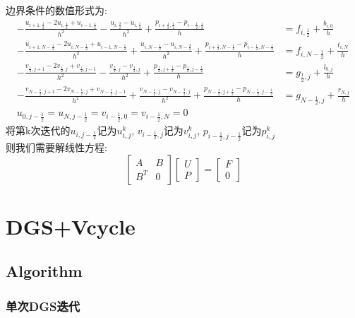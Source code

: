 \documentclass{article}
\begin{document}
边界条件的数值形式为:
\begin{align*}
-\frac{u_{i+1,\frac{1}{2}}-2u_{i,\frac{1}{2}}+u_{i-1,\frac{1}{2}}}{h^2}
-\frac{u_{i,\frac{3}{2}}-u_{i,\frac{1}{2}}}{h^2}
+\frac{p_{i+\frac{1}{2},\frac{1}{2}}-p_{i-\frac{1}{2},\frac{1}{2}}}{h}
&= f_{i,\frac{1}{2}}+\frac{b_{i,0}}{h}\\
-\frac{u_{i+1,N-\frac{1}{2}}-2u_{i,N-\frac{1}{2}}+u_{i-1,N-\frac{1}{2}}}{h^2}
+\frac{u_{i,N-\frac{1}{2}}-u_{i,N-\frac{3}{2}}}{h^2}
+\frac{p_{i+\frac{1}{2},N-\frac{1}{2}}-p_{i-\frac{1}{2},N-\frac{1}{2}}}{h}
&= f_{i,N-\frac{1}{2}}+\frac{t_{i,N}}{h}\\
-\frac{v_{\frac{1}{2},j+1}-2v_{\frac{1}{2},j}+v_{\frac{1}{2},j-1}}{h^2}
-\frac{v_{\frac{3}{2},j}-v_{\frac{1}{2},j}}{h^2}
+\frac{p_{\frac{1}{2},j+\frac{1}{2}}-p_{\frac{1}{2},j-\frac{1}{2}}}{h}
&= g_{\frac{1}{2},j}+\frac{l_{0,j}}{h}\\
-\frac{v_{N-\frac{1}{2},j+1}-2v_{N-\frac{1}{2},j}+v_{N-\frac{1}{2},j-1}}{h^2}
+\frac{v_{N-\frac{1}{2},j}-v_{N-\frac{3}{2},j}}{h^2}
+\frac{p_{N-\frac{1}{2},j+\frac{1}{2}}-p_{N-\frac{1}{2},j-\frac{1}{2}}}{h}
&= g_{N-\frac{1}{2},j}+\frac{r_{N,j}}{h}\\
u_{0,j-\frac{1}{2}}=u_{N,j-\frac{1}{2}}=v_{i-\frac{1}{2},0}=v_{i-\frac{1}{2},N}=0
\end{align*}
将第k次迭代的$u_{i,j-\frac{1}{2}}$记为$u^k_{i,j}$, 
$v_{i-\frac{1}{2},j}$记为$v^k_{i,j}$, 
$p_{i-\frac{1}{2},j-\frac{1}{2}}$记为$p^k_{i,j}$\\
则我们需要解线性方程:
$$
\begin{bmatrix}
	A & B\\
	B^T & 0
\end{bmatrix}
\begin{bmatrix}
	U\\
	P
\end{bmatrix}
=
\begin{bmatrix}
	F\\
	0
\end{bmatrix}
$$
\section{DGS+Vcycle}
\subsection{Algorithm}
\subsubsection{单次DGS迭代}
\end{document}
